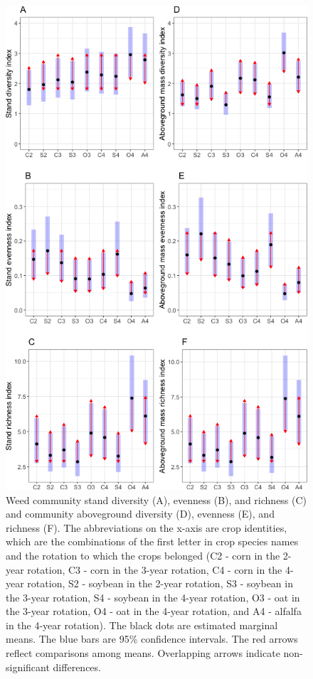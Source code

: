 \documentclass[
]{article}
\begin{document}
\begin{figure}
\centering
\includegraphics{Community_files/figure-latex/index-arrow-p-1.png}
\caption{\label{fig:index-arrow-p}Weed community stand diversity (A), evenness (B), and richness (C) and community aboveground diversity (D), evenness (E), and richness (F). The abbreviations on the x-axis are crop identities, which are the combinations of the first letter in crop species names and the rotation to which the crops belonged (C2 - corn in the 2-year rotation, C3 - corn in the 3-year rotation, C4 - corn in the 4-year rotation, S2 - soybean in the 2-year rotation, S3 - soybean in the 3-year rotation, S4 - soybean in the 4-year rotation, O3 - oat in the 3-year rotation, O4 - oat in the 4-year rotation, and A4 - alfalfa in the 4-year rotation). The black dots are estimated marginal means. The blue bars are 95\% confidence intervals. The red arrows reflect comparisons among means. Overlapping arrows indicate non-significant differences.}
\end{figure}
\end{document}
